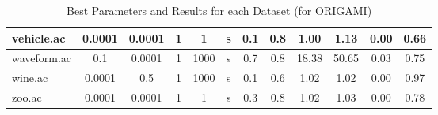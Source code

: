 \begin{table}[htbp]
\begin{tabular}{|l|c|c|c|c|c|c|c||c|c|c|c|}
		\hline
		vehicle.ac     & 0.0001   & 0.0001      & 1              & 1                   & s        & 0.1    & 0.8   & 1.00           & 1.13           & 0.00           & 0.66           \\
		\hline
		waveform.ac    & 0.1      & 0.0001      & 1              & 1000                & s        & 0.7    & 0.8   & 18.38          & 50.65          & 0.03           & 0.75           \\
		\hline
		wine.ac        & 0.0001   & 0.5         & 1              & 1000                & s        & 0.1    & 0.6   & 1.02           & 1.02           & 0.00           & 0.97           \\
		\hline
		zoo.ac         & 0.0001   & 0.0001      & 1              & 1                   & s        & 0.3    & 0.8   & 1.02           & 1.03           & 0.00           & 0.78           \\
		\hline
		\end{tabular}
	\caption{Best Parameters and Results for each Dataset (for ORIGAMI)}
	\label{tab:best_runs_for_each_db_origami}
\end{table}